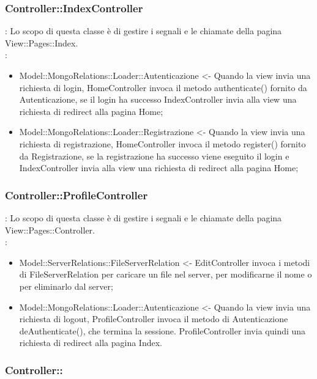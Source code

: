 {		\subsubsection{Controller::\-IndexController}{
				\textbf{\tipo}: Lo scopo di questa classe è di gestire i segnali e le chiamate della pagina View::\-Pages::\-Index.\\	
				\textbf{\relaz}:
					\begin{itemize}
						\item Model::\-MongoRelations::\-Loader::\-Autenticazione <- Quando la view invia una richiesta di login, HomeController invoca il metodo authenticate() fornito da Autenticazione, se il login ha successo IndexController invia alla view una richiesta di redirect alla pagina Home;
						\item Model::\-MongoRelations::\-Loader::\-Registrazione <- Quando la view invia una richiesta di registrazione, HomeController invoca il metodo register() fornito da Registrazione, se la registrazione ha successo viene eseguito il login e IndexController invia alla view una richiesta di redirect alla pagina Home;
					\end{itemize}
		}
				
		\subsubsection{Controller::\-ProfileController}{
						\textbf{\tipo}: Lo scopo di questa classe è di gestire i segnali e le chiamate della pagina View::\-Pages::\-Controller.\\	
						\textbf{\relaz}:
							\begin{itemize}
								\item Model::\-ServerRelations::\-FileServerRelation <- EditController invoca i metodi di FileServerRelation per caricare un file nel server, per modificarne il nome o per eliminarlo dal server;
								\item Model::\-MongoRelations::\-Loader::\-Autenticazione <- Quando la view invia una richiesta di logout, ProfileController invoca il metodo di Autenticazione deAuthenticate(), che termina la sessione. ProfileController invia quindi una richiesta di redirect alla pagina Index.
							\end{itemize}
				}
			}
		\subsubsection{Controller::\-}